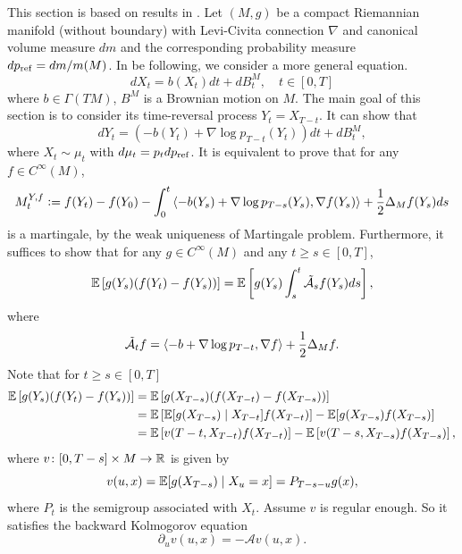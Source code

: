 This section is based on results in \cite{de2022riemannian}. Let $(M,g)$ be a compact Riemannian manifold (without boundary) with Levi-Civita connection $\nabla$ and canonical volume measure $dm$ and the corresponding probability measure $dp_{\operatorname{ref}} = dm / m(M)$. In be following, we consider a more general equation.
\begin{equation*}
    dX_t = b(X_t)dt + dB^M_t,\quad t \in [0,T]
\end{equation*}
where $b \in \Gamma(TM)$, $B^M$ is a Brownian motion on $M$. The main goal of this section is to consider its time-reversal process $Y_t = X_{T-t}$. It can show that \begin{equation*}
    dY_t = (-b(Y_t) + \nabla \log p_{T-t}(Y_t))dt + dB^M_t,
\end{equation*}
where $X_t \sim \mu_t$ with $d\mu_t = p_t dp_{\operatorname{ref}}$. It is equivalent to prove that for any $f \in C^\infty(M)$,
\begin{equation*}
    M^{Y,f}_t \vcentcolon= f(Y_t) - f(Y_0) - \int_0^t \left\langle -b(Y_s) + \nabla \log p_{T-s}(Y_s),\nabla f(Y_s) \right\rangle + \frac{1}{2}\Delta_Mf(Y_s)ds
\end{equation*}
is a martingale, by the weak uniqueness of Martingale problem. Furthermore, it suffices to show that for any $g \in C^\infty(M)$ and any $t \geq s \in [0,T]$,
\begin{equation*}
    \mathbb{E}\left[g(Y_s)(f(Y_t)-f(Y_s))\right] = \mathbb{E}\left[g(Y_s)\int_s^t\tilde{\mathcal{A}}_sf(Y_s)ds\right],
\end{equation*}
where
\begin{equation*}
    \tilde{\mathcal{A}}_tf = \left\langle -b + \nabla \log p_{T-t}, \nabla f \right\rangle + \frac{1}{2}\Delta_M f.
\end{equation*}
Note that for $t \geq s \in [0,T]$
\begin{align*}
    \mathbb{E}\left[g(Y_s)(f(Y_t)-f(Y_s))\right] &= \mathbb{E}\left[g(X_{T-s})(f(X_{T-t})-f(X_{T-s}))\right] \\
    &= \mathbb{E}\left[\mathbb{E}[g(X_{T-s}) \mid X_{T-t}]f(X_{T-t})\right] - \mathbb{E}[g(X_{T-s})f(X_{T-s})] \\
    &= \mathbb{E}\left[v(T-t,X_{T-t})f(X_{T-t})\right]- \mathbb{E}\left[v(T-s,X_{T-s})f(X_{T-s})\right],
\end{align*}
where $v \colon [0,T-s] \times M \rightarrow \mathbb{R}$ is given by
\begin{equation*}
    v(u,x) = \mathbb{E}[g(X_{T-s}) \mid X_u = x] = P_{T-s-u}g(x),
\end{equation*}
where $P_t$ is the semigroup associated with $X_t$. Assume $v$ is regular enough. So it satisfies the backward Kolmogorov equation
\begin{equation*}
    \partial_u v(u,x) = -\mathcal{A}v(u,x).
\end{equation*}
